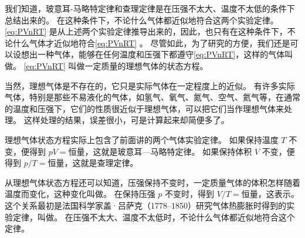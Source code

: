 我们知道，玻意耳-马略特定律和查理定律是在压强不太大、温度不太低的条件下总结出来的。
在这种条件下，不论什么气体都近似地符合这两个实验定律。
\cref{eq:PVnRT} 是从上述两个实验定律推导出来的，因此，也只有在这种条件下，不论什么气体才近似地符合\cref{eq:PVnRT} 。
尽管如此，为了研究的方便，我们还是可以设想出一种气体，能够在任何温度和压强下都遵守\cref{eq:PVnRT}，这样的气体叫做。
\cref{eq:PVnRT} 叫做一定质量的理想气体的状态方程。

当然，理想气体是不存在的，它只是实际气体在一定程度上的近似。
有许多实际气体，特别是那些不易液化的气体，如氢气、氧气、氮气、空气、氦气等，在通常的温度和压强下，它们的性质很近似于理想气体，可以把它们当作理想气体来处理。
这样处理的结果，误差很小，可是计算起来却简便多了。

理想气体状态方程实际上包含了前面讲的两个气体实验定律。
如果保持温度 $T$ 不变，便得到 $pV=\text{恒量}$，这就是玻意耳—马略特定律。
如果保持体积 $V$ 不变，便得到 $p/T=\text{恒量}$，这就是查理定律。

从理想气体状态方程还可以知道，压强保持不变时，一定质量气体的体积怎样随着温度而变化，这种变化叫做。
在保持压强 $p$ 不变时，得到 $V/T=\text{恒量}$，这表示。
这个关系最初是法国科学家盖·吕萨克（1778--1850）研究气体热膨胀时得到的实验定律，叫做。
在压强不太大、温度不太低时，不论什么气体都近似地符合这个定律。


